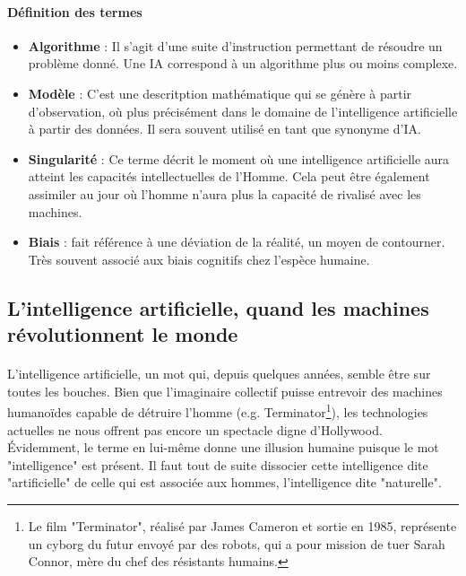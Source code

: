 \documentclass[10pt, french, a4paper]{article}
\begin{document}
\paragraph{Définition des termes}
\begin{itemize}
    \item \textbf{Algorithme} : Il s'agit d'une suite d'instruction permettant de résoudre un problème donné. Une IA correspond à un algorithme plus ou moins complexe.
    \item \textbf{Modèle} : C'est une descritption mathématique qui se génère à partir d'observation, où plus précisément dans le domaine de l'intelligence artificielle à partir des données. Il sera souvent utilisé en tant que synonyme d'IA. 
    \item \textbf{Singularité} : Ce terme décrit le moment où une intelligence artificielle aura atteint les capacités intellectuelles de
    l’Homme. Cela peut être également assimiler au jour où l'homme n'aura plus la capacité de rivalisé avec les machines.
    \item \textbf{Biais} : fait référence à une déviation de la réalité, un moyen de contourner. Très souvent associé aux biais cognitifs chez l'espèce humaine.
\end{itemize}

\subsection{L'intelligence artificielle, quand les machines révolutionnent le monde}
\label{subsec:ia}

\paragraph{}
L’intelligence artificielle, un mot qui, depuis quelques années, semble être sur toutes les bouches. Bien que l’imaginaire collectif puisse entrevoir des machines humanoïdes capable de détruire l’homme (e.g. Terminator\footnote{Le film "Terminator", réalisé par James Cameron et sortie en 1985, représente un cyborg du futur envoyé par des robots, qui a pour mission de tuer Sarah Connor, mère du chef des résistants humains.}), les technologies actuelles ne nous offrent pas encore un spectacle digne d’Hollywood. Évidemment, le terme en lui-même donne une illusion humaine puisque le mot "intelligence" est présent. Il faut tout de suite dissocier cette intelligence dite "artificielle" de celle qui est associée aux hommes, l’intelligence dite "naturelle".
\end{document}
